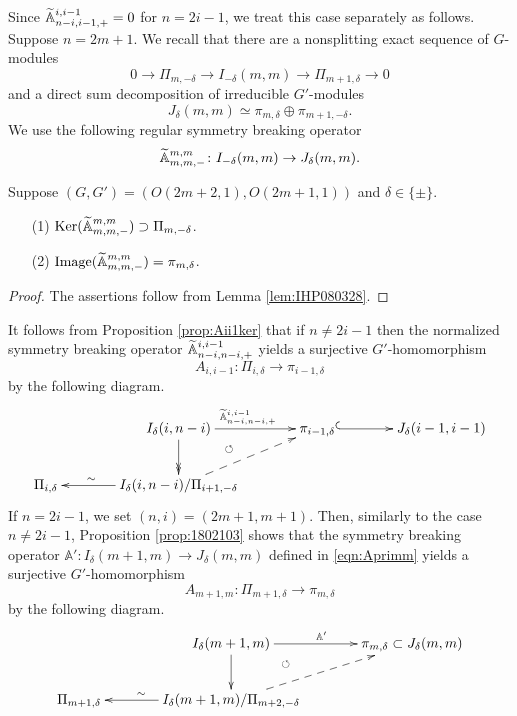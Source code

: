 Since ${\widetilde{\mathbb{A}}}_{{n-i},{i-1},{+}}^{{i,i-1}}=0$
 for $n=2i-1$, 
 we treat this case separately as follows.  
Suppose $n=2m+1$.  
We recall that there are a nonsplitting exact sequence of $G$-modules
\[
  0 \to \Pi_{m,-\delta} \to I_{-\delta}(m,m) \to \Pi_{m+1,\delta} \to 0
\]
 and a direct sum decomposition of irreducible $G'$-modules
\[
   J_{\delta}(m,m) \simeq \pi_{m,\delta} \oplus \pi_{m+1,-\delta}.  
\]
We use the following regular symmetry breaking operator
\[
  {\widetilde{\mathbb{A}}}_{{m},{m},{-}}^{{m,m}} \colon I_{-\delta}(m,m) \to J_{\delta}(m,m).  
\]
\begin{proposition}
\label{prop:IHP180328}
Suppose $(G,G')=(O(2m+2,1),O(2m+1,1))$
 and $\delta \in \{\pm\}$.  
\begin{enumerate}
\item[{\rm{(1)}}]
${\operatorname{Ker}}({\widetilde{\mathbb{A}}}_{{m},{m},{-}}^{{m,m}}) \supset \Pi_{m,-\delta}$.  
\item[{\rm{(2)}}]
${\operatorname{Image}}({\widetilde{\mathbb{A}}}_{{m},{m},{-}}^{{m,m}})=\pi_{m,\delta}$.  
\end{enumerate}
\end{proposition}
\begin{proof}
The assertions follow from Lemma \ref{lem:IHP080328}.  
\end{proof}

It follows from Proposition \ref{prop:Aii1ker}
 that if $n \ne 2i-1$ then the normalized symmetry breaking operator ${\widetilde{\mathbb{A}}}_{{n-i},{n-i},{+}}^{{i,i-1}}$
 yields a surjective $G'$-homomorphism
\begin{equation}
\label{eqn:Pipi-}
  A_{{i},{i-1}} \colon \Pi_{i,\delta} \to \pi_{i-1,\delta}
\end{equation}
by the following diagram.  
\begin{eqnarray*}
\xymatrix@C=16pt{
&&I_{\delta}(i,n-i)\ar[rr]^{\Atbb {n-i}{n-i}+{i,i-1}}
\ar@{}[dr]^\circlearrowleft
\ar@{->>}[d]
&&\pi_{i-1,\delta} \ar@{^{(}->}[rr]
&&J_{\delta}(i-1,i-1)
\\
\Pi_{i,\delta}
&&\ar[ll]_{\sim\qquad\quad} I_{\delta}(i,n-i)/\Pi_{i+1,-\delta}\ar@{-->}[urr]
&&
&&
}
\end{eqnarray*}
If $n=2i-1$, 
 we set $(n,i)=(2m+1,m+1)$.  
Then, 
similarly to the case $n \ne 2i-1$, 
 Proposition \ref{prop:1802103} shows
 that the symmetry breaking operator 
 ${\mathbb{A}}' \colon I_{\delta}(m+1,m) \to J_{\delta}(m,m)$ 
 defined in \eqref{eqn:Aprimm}
 yields a surjective $G'$-homomorphism
\begin{equation}
\label{eqn:Pmpm-}
   A_{m+1,m} \colon \Pi_{m+1,\delta} \to \pi_{m,\delta}
\end{equation}
 by the following diagram.  
\begin{eqnarray*}
\xymatrix@C=16pt{
&&I_{\delta}(m+1,m)\ar[rr]^{{\mathbb{A}}'} 
\ar@{->}[d]
\ar@{}[dr]^\circlearrowleft
&&\pi_{m,\delta} 
\subset J_{\delta}(m,m)
\\
\Pi_{m+1,\delta}
&&\ar[ll]_{\sim\quad\quad} I_{\delta}(m+1,m)/\Pi_{m+2,-\delta}\ar@{-->}[urr]
&&
}
\end{eqnarray*}

